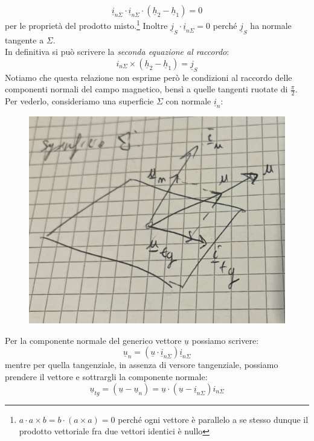 \documentclass{book}
\begin{document}
        \begin{equation}
            \underline{i}_{n\Sigma} \cdot \underline{i}_{n\Sigma} \cdot (\underline{h}_{2}-\underline{h}_{1}) = 0
        \end{equation}
        per le proprietà del prodotto misto.\footnote{$a \cdot a \times b = b \cdot (a \times a) = 0$ perché ogni vettore è parallelo a se stesso dunque il prodotto vettoriale fra due vettori identici è nullo} Inoltre $\underline{j}_{S} \cdot \underline{i}_{n \Sigma} = 0$ perché $\underline{j}_{S}$ ha normale tangente a $\Sigma$.\\
        In definitiva si può scrivere la \textit{seconda equazione al raccordo}:
        \begin{equation}
            \label{eqn:equazione_raccordo2}
            i_{n \Sigma} \times (\underline{h}_{2}-\underline{h}_{1}) = \underline{j}_{S}
        \end{equation}
        Notiamo che questa relazione non esprime però le condizioni al raccordo delle componenti normali del campo magnetico, bensì a quelle tangenti ruotate di $\frac{\pi}{2}$. Per vederlo, consideriamo una superficie $\Sigma$ con normale $\underline{i}_{n}$:
        \begin{figure}[h!]
            \centering
            \includegraphics[width=0.60\linewidth]{img/Chapter_one/Chapt1img7.png}
        \end{figure}
        Per la componente normale del generico vettore $\underline{u}$ possiamo scrivere:
        \begin{equation}
            \underline{u}_{n} = (\underline{u} \cdot \underline{i}_{n \Sigma}) \underline{i}_{n \Sigma}
        \end{equation}
        mentre per quella tangenziale, in assenza di versore tangenziale, possiamo prendere il vettore e sottrargli la componente normale:
        \begin{equation}
            \underline{u}_{tg} = (\underline{u}-\underline{u}_{n}) = \underline{u} \cdot (\underline{u}-\underline{i}_{n \Sigma}) i_{n \Sigma}
        \end{equation}
\end{document}
